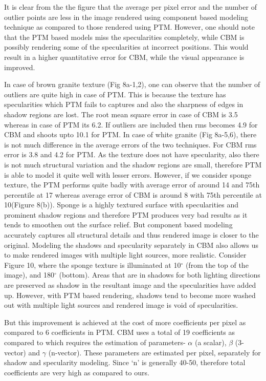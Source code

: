 It is clear from the the figure that the average per pixel error and the number
of outlier points are less in the image rendered using component based modeling
technique as compared to those rendered using PTM. However, one should note that
the PTM based models miss the specularities completely, while CBM is possibly
rendering some of the specularities at incorrect positions. This would result in
a higher quantitative error for CBM, while the visual appearance is improved.

In case of brown granite texture (Fig 8a-1,2), one can observe that the number
of outliers are quite high in case of PTM. This is because the texture has
specularities which PTM fails to captures and also the sharpness of edges in
shadow regions are lost. The root mean square error in case of CBM is 3.5 whereas in case of PTM its 6.2. 
If outliers are included then rms becomes 4.9 for CBM and shoots upto 10.1 for PTM.
In case of white granite (Fig 8a-5,6), there is not
much difference in the average errors of the two techniques. For CBM rms error is 3.8 and 4.2 for PTM. As the texture does
not have specularity, also there is not much structural variation and the shadow
regions are small, therefore PTM is able to model it quite well with lesser
errors. However, if we consider sponge texture, the PTM performs quite badly
with average error of around 14 and 75th percentile at 17 whereas average error
of CBM is around 8 with 75th percentile at 10(Figure 8(b)). Sponge is a highly
textured surface with specularities and prominent shadow regions and therefore
PTM produces very bad results as it tends to smoothen out the surface relief.
But component based modeling accurately captures all structural details and thus
rendered image is closer to the original.
Modeling the shadows and specularity separately in CBM also allows us to make rendered images with
multiple light sources, more realistic. Consider Figure 10,
where the sponge texture
is illuminated at 10$^{\circ}$ (from the top of the image), and 180$^{\circ}$
(bottom). Areas that are in shadows for both lighting directions are preserved
as shadow in the resultant image and the specularities have added up. However, with PTM based rendering, shadows tend
to become more washed out with multiple light sources and rendered image is void of specularities.

But this improvement is achieved at the cost of more coefficients per pixel as compared to 6 coefficients in PTM.
CBM uses a total of 19 coefficients as compared to \cite{A10} which requires the estimation of parameters- $\alpha$ (a scalar), 
$\beta$ (3-vector) and $\gamma$ (n-vector). These parameters are estimated per pixel, separately for shadow and specularity
modeling. Since `n' is generally 40-50, therefore total coefficients are very high as compared to ours.

